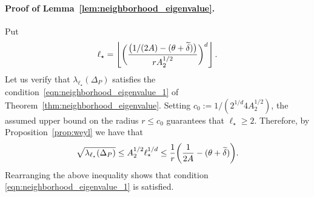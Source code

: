 \paragraph{Proof of Lemma~\ref{lem:neighborhood_eigenvalue}.}
Put
\begin{equation*}
\ell_{\star} = \left\lfloor \biggl(\frac{\bigl(1/(2A) - (\theta + \widetilde{\delta})\bigr)}{rA_2^{1/2}}\biggr)^d \right\rfloor.
\end{equation*}
Let us verify that $\lambda_{\ell_{\star}}(\Delta_P)$ satisfies the condition~\ref{eqn:neighborhood_eigenvalue_1} of Theorem~\ref{thm:neighborhood_eigenvalue}. Setting $c_0 := 1/(2^{1/d}4A_2^{1/2})$, the assumed upper bound on the radius $r \leq c_0$ guarantees that $\ell_{\star} \geq 2$. Therefore, by Proposition~\ref{prop:weyl} we have that
\begin{align*}
\sqrt{\lambda_{\ell_{\star}}(\Delta_P)} \leq A_2^{1/2}\ell_{\star}^{1/d} \leq  \frac{1}{r}\biggl(\frac{1}{2A} - (\theta + \widetilde{\delta})\biggr).
\end{align*}
Rearranging the above inequality shows that condition \eqref{eqn:neighborhood_eigenvalue_1} is satisfied. 

